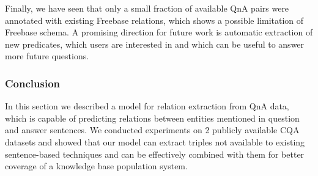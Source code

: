 Finally, we have seen that only a small fraction of available QnA pairs were annotated with existing Freebase relations, which shows a possible limitation of Freebase schema.
A promising direction for future work is automatic extraction of new predicates, which users are interested in and which can be useful to answer more future questions.

\subsubsection{Conclusion}

In this section we described a model for relation extraction from QnA data, which is capable of predicting relations between entities mentioned in question and answer sentences.
We conducted experiments on 2 publicly available CQA datasets and showed that our model can extract triples not available to existing sentence-based techniques and can be effectively combined with them for better coverage of a knowledge base population system.




